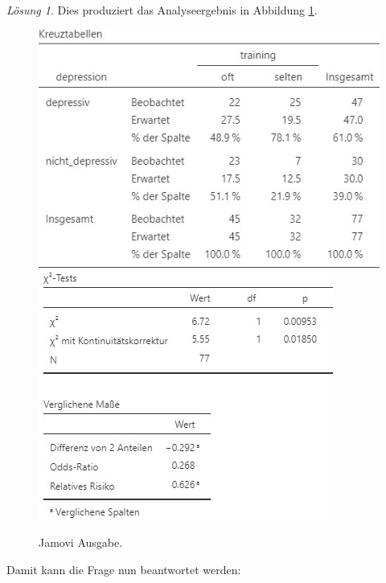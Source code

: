 \documentclass[
]{book}
\theoremstyle{definition}
\theoremstyle{definition}
\theoremstyle{definition}
\theoremstyle{definition}
\theoremstyle{remark}
\newtheorem*{solution}{Lösung}
\begin{document}
\begin{solution}
Dies produziert das Analyseergebnis in Abbildung
\ref{fig:sol-depression-training-output}.

\begin{figure}

{\centering \includegraphics{figures/09-exr-depression-training-aggdata-view} \includegraphics{figures/09-exr-depression-training-jmv-output} 

}

\caption{Jamovi Ausgabe.}\label{fig:sol-depression-training-output}
\end{figure}

Damit kann die Frage nun beantwortet werden:


\end{solution}
\end{document}
